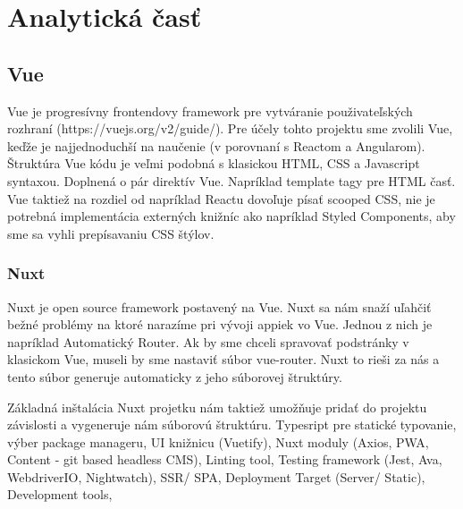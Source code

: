 
\chapter{Analytická časť}

\section{Vue}
Vue je progresívny frontendovy framework pre vytváranie použivateľských rozhraní (https://vuejs.org/v2/guide/). Pre účely tohto projektu sme zvolili Vue, keďže je najjednoduchší na naučenie (v porovnaní s Reactom a Angularom). Štruktúra Vue kódu je veľmi podobná s klasickou HTML, CSS a Javascript syntaxou. Doplnená o pár direktív Vue. Napríklad template tagy pre HTML časť. Vue taktiež na rozdiel od napríklad Reactu dovoľuje písať scooped CSS, nie je potrebná implementácia externých knižníc ako napríklad Styled Components, aby sme sa vyhli prepísavaniu CSS štýlov.


\subsection{Nuxt}
Nuxt je open source framework postavený na Vue. Nuxt sa nám snaží uľahčiť bežné problémy na ktoré narazíme pri vývoji appiek vo Vue. Jednou z nich je napríklad Automatický Router. Ak by sme chceli spravovať podstránky v klasickom Vue, museli by sme nastaviť súbor vue-router. Nuxt to rieši za nás a tento súbor generuje automaticky z jeho súborovej štruktúry. 

Základná inštalácia Nuxt projetku nám taktiež umožňuje pridať do projektu závislosti a vygeneruje nám súborovú štruktúru. Typesript pre statické typovanie, výber package manageru, UI knižnicu (Vuetify), Nuxt moduly (Axios, PWA, Content - git based headless CMS), Linting tool, Testing framework (Jest, Ava, WebdriverIO, Nightwatch), SSR/ SPA, Deployment Target (Server/ Static), Development tools,